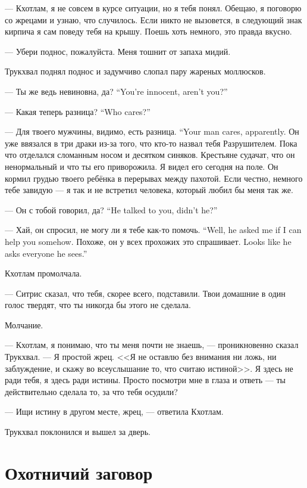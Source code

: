 --- Кхотлам, я не совсем в курсе ситуации, но я тебя понял.
Обещаю, я поговорю со жрецами и узнаю, что случилось.
Если никто не вызовется, в следующий знак кирпича я сам поведу тебя на крышу.
Поешь хоть немного, это правда вкусно.

--- Убери поднос, пожалуйста.
Меня тошнит от запаха мидий.

Трукхвал поднял поднос и задумчиво слопал пару жареных моллюсков.

{--- Ты же ведь невиновна, да?}
{``You're innocent, aren't you?''}

{--- Какая теперь разница?}
{``Who cares?''}

{--- Для твоего мужчины, видимо, есть разница.}
{``Your man cares, apparently.}
Он уже ввязался в три драки из-за того, что кто-то назвал тебя Разрушителем.
Пока что отделался сломанным носом и десятком синяков.
Крестьяне судачат, что он ненормальный и что ты его приворожила.
Я видел его сегодня на поле.
Он кормил грудью твоего ребёнка в перерывах между пахотой.
Если честно, немного тебе завидую --- я так и не встретил человека, который любил бы меня так же.

{--- Он с тобой говорил, да?}
{``He talked to you, didn't he?''}

{--- Хай, он спросил, не могу ли я тебе как-то помочь.}
{``Well, he asked me if I can help you somehow.}
{Похоже, он у всех прохожих это спрашивает.}
{Looks like he asks everyone he sees.''}

Кхотлам промолчала.

--- Ситрис сказал, что тебя, скорее всего, подставили.
Твои домашние в один голос твердят, что ты никогда бы этого не сделала.

Молчание.

--- Кхотлам, я понимаю, что ты меня почти не знаешь, --- проникновенно сказал Трукхвал.
--- Я простой жрец.
<<Я не оставлю без внимания ни ложь, ни заблуждение, и скажу во всеуслышание то, что считаю истиной>>.
Я здесь не ради тебя, я здесь ради истины.
Просто посмотри мне в глаза и ответь --- ты действительно сделала то, за что тебя осудили?

--- Ищи истину в другом месте, жрец, --- ответила Кхотлам.

Трукхвал поклонился и вышел за дверь.

\section{Охотничий заговор}

